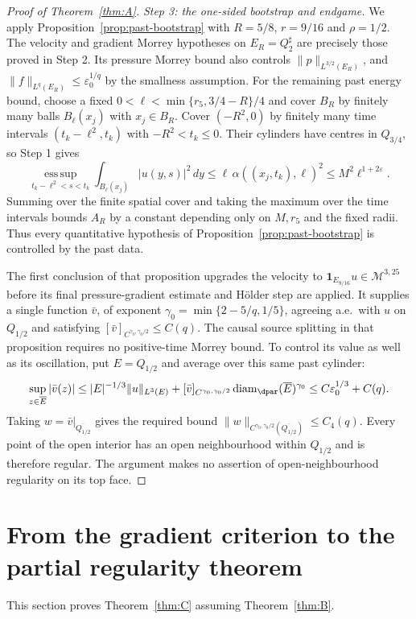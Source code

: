\documentclass[11pt,reqno]{amsart}
\begin{document}
\begin{proof}[Proof of Theorem~\ref{thm:A}]
\emph{Step 3: the one-sided bootstrap and endgame.}
We apply Proposition~\ref{prop:past-bootstrap} with
$R=5/8$, $r=9/16$ and $\rho=1/2$.
The velocity and gradient Morrey hypotheses on $E_R=Q_2^\sharp$
are precisely those proved in Step 2. Its pressure Morrey bound also
controls $\|p\|_{L^{3/2}(E_R)}$, and
$\|f\|_{L^q(E_R)}\le\varepsilon_0^{1/q}$ by the smallness assumption.
For the remaining past energy bound, choose a fixed
$0<\ell<\min\{r_5,3/4-R\}/4$ and cover $B_R$ by finitely many
balls $B_\ell(x_j)$ with $x_j\in B_R$. Cover $(-R^2,0)$ by finitely
many time intervals $(t_k-\ell^2,t_k)$ with $-R^2<t_k\le0$.
Their cylinders have centres in $Q_{3/4}$, so Step 1 gives
\[
 \operatorname*{ess\,sup}_{t_k-\ell^2<s<t_k}
    \int_{B_\ell(x_j)}|u(y,s)|^2\,dy
   \le \ell\,\alpha((x_j,t_k),\ell)^2
   \le M^2\ell^{1+2\varepsilon}.
\]
Summing over the finite spatial cover and taking the maximum over the
time intervals bounds $A_R$ by a constant depending only on $M,r_5$
and the fixed radii. Thus every quantitative hypothesis of
Proposition~\ref{prop:past-bootstrap} is controlled by the past data.

The first conclusion of that proposition upgrades the velocity to
$\mathbf1_{E_{9/16}}u\in\mathcal M^{3,25}$ before its final
pressure-gradient estimate and H\"older step are applied.
It supplies a single function $\bar v$, of exponent
$\gamma_0=\min\{2-5/q,1/5\}$, agreeing a.e.\ with $u$ on $Q_{1/2}$
and satisfying $[\bar v]_{C^{\gamma_0,\gamma_0/2}}\le C(q)$.
The causal source splitting in that proposition requires no positive-time
Morrey bound. To control its value as well as its oscillation, put
$E=Q_{1/2}$ and average over this same past cylinder:
\[
 \sup_{z\in\overline E}|\bar v(z)|
 \le |E|^{-1/3}\|u\|_{L^3(E)}
       +[\bar v]_{C^{\gamma_0,\gamma_0/2}}
           \operatorname{diam}_{\dpar}(\overline E)^{\gamma_0}
 \le C\varepsilon_0^{1/3}+C(q).
\]
Taking $w=\bar v|_{\overline{Q_{1/2}}}$ gives the required bound
$\|w\|_{C^{\gamma_0,\gamma_0/2}(\overline{Q_{1/2}})}\le C_4(q)$.
Every point of the open interior has an open neighbourhood within
$Q_{1/2}$ and is therefore regular. The argument makes no assertion of
open-neighbourhood regularity on its top face.
\end{proof}
\section{From the gradient criterion to the partial regularity theorem}
\label{sec:covering}

This section proves Theorem~\ref{thm:C} assuming Theorem~\ref{thm:B}.
\end{document}
